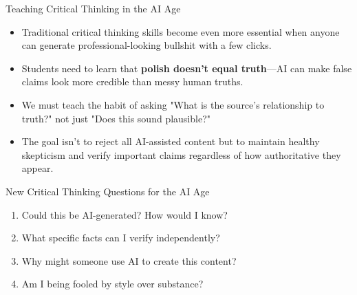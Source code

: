 \documentclass{beamer}
\begin{document}
	\begin{frame}{Teaching Critical Thinking in the AI Age}
		\begin{itemize}
			\item Traditional critical thinking skills become even more essential when anyone can generate professional-looking bullshit with a few clicks.
			\item Students need to learn that \textbf{polish doesn't equal truth}—AI can make false claims look more credible than messy human truths.
			\item We must teach the habit of asking "What is the source's relationship to truth?" not just "Does this sound plausible?"
			\item The goal isn't to reject all AI-assisted content but to maintain healthy skepticism and verify important claims regardless of how authoritative they appear.
		\end{itemize}
		
		\begin{block}{New Critical Thinking Questions for the AI Age}
			\begin{enumerate}
				\item Could this be AI-generated? How would I know?
				\item What specific facts can I verify independently?
				\item Why might someone use AI to create this content?
				\item Am I being fooled by style over substance?
			\end{enumerate}
		\end{block}
	\end{frame}
	
\end{document}
